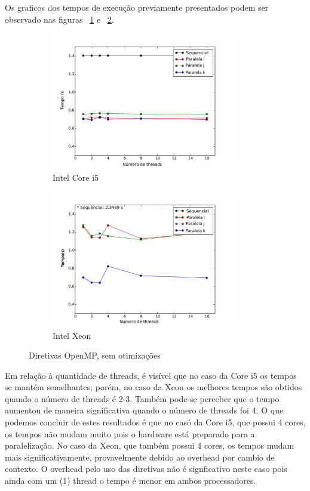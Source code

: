 \documentclass[a4paper,12pt,fleqn]{article}
\begin{document}
Os graficos dos tempos de execução previamente presentados podem ser observado nas figuras ~\ref{fig:corei5so} e ~\ref{fig:xeonso}.
 
\begin{figure}[htb] 
    \centering
    \begin{subfigure}{.5\textwidth}
        \centering
        \includegraphics[height=6cm]{Images/corei5so} 
        \caption{Intel Core i5}
        \label{fig:corei5so} 
    \end{subfigure}%
    \begin{subfigure}{.5\textwidth}
        \centering
        \includegraphics[height=6cm]{Images/xeonso} 
        \caption{Intel Xeon}
        \label{fig:xeonso} 
    \end{subfigure}
    \caption{Diretivas OpenMP, sem otimizações}
    \label{fig:so}
\end{figure} 

Em relação à quantidade de threads, é visível que no caso da Core i5 os tempos se mantém semelhantes; porém, no caso da Xeon os melhores tempos são obtidos quando o número de threads é 2-3. Também pode-se perceber que o tempo aumentou de maneira significativa quando o número de threads foi 4. O que podemos concluir de estes resultados é que no casó da Core i5, que possui 4 cores, os tempos não mudam muito pois o hardware está preparado para a paralelização. No caso da Xeon, que também possui 4 cores, os tempos mudam mais significativamente, provavelmente debido ao overhead por cambio de contexto. O overhead pelo uso das diretivas não é signficativo neste caso pois ainda com um (1) thread o tempo é menor em ambos processadores.
\end{document}
